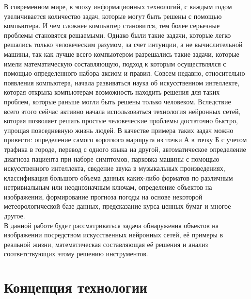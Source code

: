 \documentclass[bachelor, och, coursework]{SCWorks}
\begin{document}


\tableofcontents

\intro

    В современном мире, в эпоху информационных технологий, с каждым годом увеличивается количество задач, которые могут быть решены с помощью компьютера. И чем сложнее компьютер становится, тем более серьезные проблемы становятся решаемыми. Однако были такие задачи, которые легко решались только человеческим разумом, за счет интуиции, а не вычислительной машины, так как лучше всего компьютером разрешались такие задачи, которые имели математическую составляющую, подход к которым осуществлялся с помощью определенного набора аксиом и правил. Совсем недавно, относительно появления компьютера, начала развиваться наука об искусственном интеллекте, которая открыла компьютерам возможность находить решения для таких проблем, которые раньше могли быть решены только человеком. Вследствие всего этого сейчас активно начала использоваться технология нейронных сетей, которая позволяет решать простые человеческие проблемы достаточно быстро, упрощая повседневную жизнь людей. В качестве примера таких задач можно привести: определение самого короткого маршрута из точки А в точку Б с учетом трафика в городе, перевод с одного языка на другой, автоматическое определение диагноза пациента при наборе симптомов, парковка машины с помощью искусственного интеллекта, сведение звука в музыкальных произведениях, классификация большого объема данных каких-либо форматов по различным нетривиальным или неоднозначным ключам, определение объектов на изображении, формирование прогноза погоды на основе некоторой метеорологической базе данных, предсказание курса ценных бумаг и многое другое.\\
    В данной работе будет рассматриваться задача обнаружения объектов на изображении посредством искусственных нейронных сетей, её примеры в реальной жизни, математическая составляющая её решения и анализ соответствующих этому решению инструментов.

\section{Концепция технологии}
\end{document}

